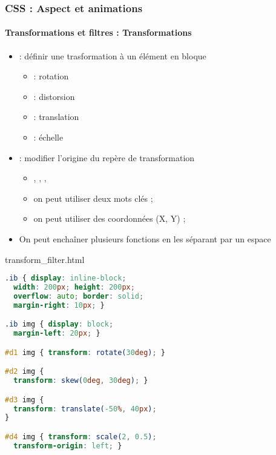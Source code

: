 \documentclass[xcolor=table]{beamer}
\begin{document}
\begin{frame}[fragile]
\frametitle{CSS : Aspect et animations}
\framesubtitle{Transformations et filtres : Transformations}

\begin{minipage}{0.60\textwidth}
	\begin{itemize}
		\item {} : définir une trasformation à un élément en bloque
		\begin{itemize}
			\item {} : rotation
			\item {} : distorsion
			\item {} : translation
			\item {} : échelle
		\end{itemize}
		\item {} : modifier l'origine du repère de transformation
		\begin{itemize}
			\item {}, , ,  
			\item on peut utiliser deux mots clés ; 
			\item on peut utiliser des coordonnées (X, Y) ; \expword{5px 10px}
		\end{itemize}
		\item On peut enchaîner plusieurs fonctions en les séparant par un espace
	\end{itemize}
\end{minipage}
%
\begin{minipage}{0.38\textwidth}
\begin{exampleblock}{transform\_filter.html}
\lstset{escapeinside=**}
\tiny\bfseries
\begin{lstlisting}[language={CSS}]
.ib { display: inline-block;
  width: 200px; height: 200px;
  overflow: auto; border: solid;
  margin-right: 10px; }

.ib img { display: block;
  margin-left: 20px; }

#d1 img { transform: rotate(30deg); }

#d2 img { 
  transform: skew(0deg, 30deg); }

#d3 img { 
  transform: translate(-50%, 40px); 
}

#d4 img { transform: scale(2, 0.5);
  transform-origin: left; }
\end{lstlisting}
\end{exampleblock}
\end{minipage}
\end{frame}
\end{document}

